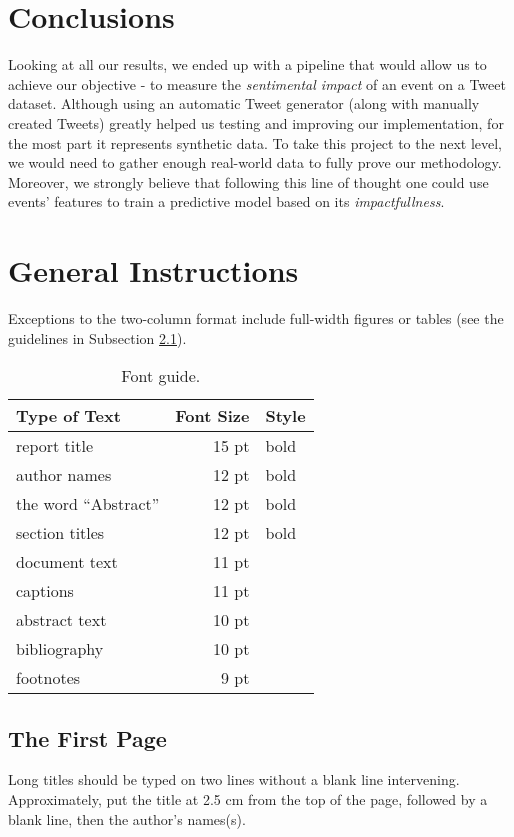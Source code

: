 \documentclass[11pt]{article}
\begin{document}
	\section{Conclusions}
	Looking at all our results, we ended up with a pipeline that would allow us to achieve our objective - to measure the \textit{sentimental impact} of an event on a Tweet dataset. Although using an automatic Tweet generator (along with manually created Tweets) greatly helped us testing and improving our implementation, for the most part it represents synthetic data. To take this project to the next level, we would need to gather enough real-world data to fully prove our methodology. Moreover, we strongly believe that following this line of thought one could use events' features to train a predictive model based on its \textit{impactfullness}.
	
	\newpage
	
	
	\section{General Instructions}
	Exceptions to the
	two-column format include full-width figures or tables (see the guidelines in
	Subsection \ref{ssec:first}).
	
	\begin{table}[h]
		\begin{center}
			\begin{tabular}{|l|rl|}
				\hline \bf Type of Text & \bf Font Size & \bf Style \\ \hline
				report title & 15 pt & bold \\
				author names & 12 pt & bold \\
				the word ``Abstract'' & 12 pt & bold \\
				section titles & 12 pt & bold \\
				document text & 11 pt  &\\
				captions & 11 pt & \\
				abstract text & 10 pt & \\
				bibliography & 10 pt & \\
				footnotes & 9 pt & \\
				\hline
			\end{tabular}
		\end{center}
		\caption{\label{font-table} Font guide.}
	\end{table}
	
	\subsection{The First Page}
	\label{ssec:first}
	Long titles should be typed on two lines
	without a blank line intervening. Approximately, put the title at 2.5
	cm from the top of the page, followed by a blank line, then the
	author's names(s).
	
\end{document}
